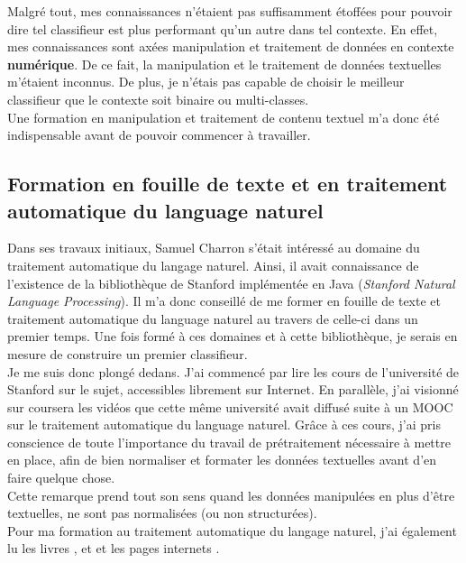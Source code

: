         Malgré tout, mes connaissances n'étaient pas suffisamment étoffées pour pouvoir dire tel classifieur est plus performant qu'un autre dans tel contexte. En effet, mes connaissances sont axées manipulation et traitement de données en contexte \textbf{numérique}. De ce fait, la manipulation et le traitement de données textuelles m'étaient inconnus. De plus, je n'étais pas capable de choisir le meilleur classifieur que le contexte soit binaire ou multi-classes.\\

        Une formation en manipulation et traitement de contenu textuel m'a donc été indispensable avant de pouvoir commencer à travailler.

\color{black}

        \subsection{Formation en fouille de texte et en traitement automatique du language naturel}
            Dans ses travaux initiaux, Samuel Charron s'était intéressé au domaine du traitement automatique du langage naturel. Ainsi, il avait connaissance de l'existence de la bibliothèque de Stanford implémentée en Java (\textit{Stanford Natural Language Processing}). Il m'a donc conseillé de me former en fouille de texte et traitement automatique du language naturel au travers de celle-ci dans un premier temps. Une fois formé à ces domaines et à cette bibliothèque, je serais en mesure de construire un premier classifieur.\\

            Je me suis donc plongé dedans. J'ai commencé par lire les cours de l’université de Stanford sur le sujet, accessibles librement sur Internet. En parallèle, j'ai visionné sur coursera les vidéos que cette même université avait diffusé suite à un MOOC sur le traitement automatique du language naturel. Grâce à ces cours, j'ai pris conscience de toute l'importance du travail de prétraitement nécessaire à mettre en place, afin de bien normaliser et formater les données textuelles avant d'en faire quelque chose.\\

            Cette remarque prend tout son sens quand les données manipulées en plus d'être textuelles, ne sont pas normalisées (ou non structurées).\\

            Pour ma formation au traitement automatique du langage naturel, j'ai également lu les livres \autocite{nlp_p}, \autocite{nltk} et \autocite{ir_book} et les pages internets \autocite{ir_web}.

